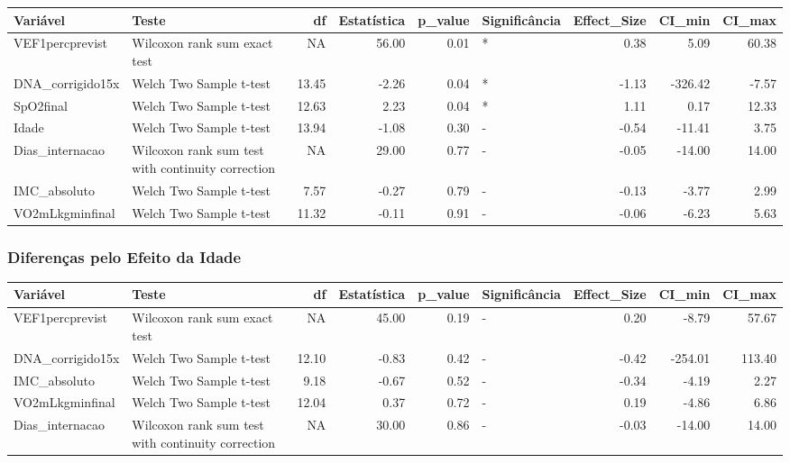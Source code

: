 \documentclass[
]{article}
\begin{document}
\begin{tabular}{l|l|r|r|r|l|r|r|r}
\hline
Variável & Teste & df & Estatística & p\_value & Significância & Effect\_Size & CI\_min & CI\_max\\
\hline
VEF1percprevist & Wilcoxon rank sum exact test & NA & 56.00 & 0.01 & * & 0.38 & 5.09 & 60.38\\
\hline
DNA\_corrigido15x & Welch Two Sample t-test & 13.45 & -2.26 & 0.04 & * & -1.13 & -326.42 & -7.57\\
\hline
SpO2final & Welch Two Sample t-test & 12.63 & 2.23 & 0.04 & * & 1.11 & 0.17 & 12.33\\
\hline
Idade & Welch Two Sample t-test & 13.94 & -1.08 & 0.30 & - & -0.54 & -11.41 & 3.75\\
\hline
Dias\_internacao & Wilcoxon rank sum test with continuity correction & NA & 29.00 & 0.77 & - & -0.05 & -14.00 & 14.00\\
\hline
IMC\_absoluto & Welch Two Sample t-test & 7.57 & -0.27 & 0.79 & - & -0.13 & -3.77 & 2.99\\
\hline
VO2mLkgminfinal & Welch Two Sample t-test & 11.32 & -0.11 & 0.91 & - & -0.06 & -6.23 & 5.63\\
\hline
\end{tabular}

\hypertarget{diferenuxe7as-pelo-efeito-da-idade}{%
\subsubsection{Diferenças pelo Efeito da
Idade}\label{diferenuxe7as-pelo-efeito-da-idade}}

\begin{tabular}{l|l|r|r|r|l|r|r|r}
\hline
Variável & Teste & df & Estatística & p\_value & Significância & Effect\_Size & CI\_min & CI\_max\\
\hline
VEF1percprevist & Wilcoxon rank sum exact test & NA & 45.00 & 0.19 & - & 0.20 & -8.79 & 57.67\\
\hline
DNA\_corrigido15x & Welch Two Sample t-test & 12.10 & -0.83 & 0.42 & - & -0.42 & -254.01 & 113.40\\
\hline
IMC\_absoluto & Welch Two Sample t-test & 9.18 & -0.67 & 0.52 & - & -0.34 & -4.19 & 2.27\\
\hline
VO2mLkgminfinal & Welch Two Sample t-test & 12.04 & 0.37 & 0.72 & - & 0.19 & -4.86 & 6.86\\
\hline
Dias\_internacao & Wilcoxon rank sum test with continuity correction & NA & 30.00 & 0.86 & - & -0.03 & -14.00 & 14.00\\
\hline
\end{tabular}
\end{document}

